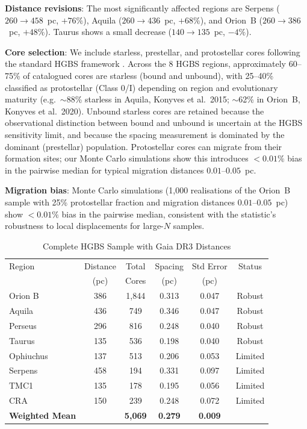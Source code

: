 \documentclass[twoside,twocolumn]{mnras}
\begin{document}
\textbf{Distance revisions}: The most significantly affected regions are Serpens
($260 \to 458$~pc, $+76\%$), Aquila ($260 \to 436$~pc, $+68\%$), and Orion~B
($260 \to 386$~pc, $+48\%$). Taurus shows a small decrease ($140 \to 135$~pc, $-4\%$).

\textbf{Core selection}: We include starless, prestellar, and protostellar cores
following the standard HGBS framework \citep{Konyves2015, Konyves2020}. Across the
8 HGBS regions, approximately 60--75\% of catalogued cores are starless (bound and
unbound), with 25--40\% classified as protostellar (Class 0/I) depending on region
and evolutionary maturity (e.g.\ $\sim$88\% starless in Aquila, Konyves et al.\ 2015;
$\sim$62\% in Orion~B, Konyves et al.\ 2020). Unbound starless cores are retained
because the observational distinction between bound and unbound is uncertain at the
HGBS sensitivity limit, and because the spacing measurement is dominated by the
dominant (prestellar) population. Protostellar cores can migrate from their formation
sites; our Monte Carlo simulations show this introduces $<0.01\%$ bias in the pairwise
median for typical migration distances $0.01$--$0.05$~pc.

\textbf{Migration bias}: Monte Carlo simulations (1,000 realisations of the Orion~B sample
with 25\% protostellar fraction and migration distances $0.01$--$0.05$~pc) show $<0.01\%$
bias in the pairwise median, consistent with the statistic's robustness to local
displacements for large-$N$ samples.

\begin{table}
\caption{Complete HGBS Sample with Gaia DR3 Distances}
\label{tab:sample}
\begin{tabular}{lccccc}
\toprule
Region & Distance & Total & Spacing & Std Error & Status \\
       & (pc)   & Cores & (pc)   & (pc)      &  \\
\midrule
Orion B  & 386 & 1,844 & 0.313 & 0.047 & Robust \\
Aquila   & 436 & 749   & 0.346 & 0.047 & Robust \\
Perseus  & 296 & 816   & 0.248 & 0.040 & Robust \\
Taurus   & 135 & 536   & 0.198 & 0.040 & Robust \\
Ophiuchus& 137 & 513   & 0.206 & 0.053 & Limited \\
Serpens  & 458 & 194   & 0.331 & 0.097 & Limited \\
TMC1     & 135 & 178   & 0.195 & 0.056 & Limited \\
CRA      & 150 & 239   & 0.248 & 0.072 & Limited \\
\midrule
\textbf{Weighted Mean} &  & \textbf{5,069} & \textbf{0.279} & \textbf{0.009} &  \\
\bottomrule
\end{tabular}
\end{table}
\end{document}
